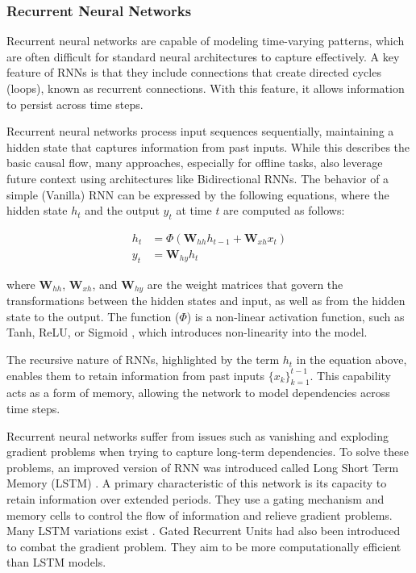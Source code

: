 \subsubsection*{Recurrent Neural Networks}
Recurrent neural networks \cite{giles1994dynamic} are capable of modeling time-varying patterns, which are often difficult for standard neural architectures to capture effectively. A key feature of RNNs is that they include connections that create directed cycles (loops), known as recurrent connections. With this feature, it allows information to persist across time steps.

Recurrent neural networks process input sequences sequentially, maintaining a hidden state that captures information from past inputs. While this describes the basic causal flow, many approaches, especially for offline tasks, also leverage future context using architectures like Bidirectional RNNs. The behavior of a simple (Vanilla) RNN can be expressed by the following equations, where the hidden state $h_t$ and the output $y_t$ at time $t$ are computed as follows:

\begin{align}
h_t &= \Phi(\mathbf{W}_{hh}h_{t-1} + \mathbf{W}_{xh}x_t) \label{eq:rnn_hidden_state} \\
y_t &= \mathbf{W}_{hy}h_t \label{eq:rnn_output}
\end{align}

where $\mathbf{W}_{hh}$, $\mathbf{W}_{xh}$, and $\mathbf{W}_{hy}$ are the weight matrices that govern the transformations between the hidden states and input, as well as from the hidden state to the output. The function ($\Phi$) is a non-linear activation function, such as Tanh, ReLU, or Sigmoid \cite{Goodfellow-et-al-2016}, which introduces non-linearity into the model.

The recursive nature of RNNs, highlighted by the term $h_t$ in the equation above, enables them to retain information from past inputs $\{x_k\}_{k=1}^{t-1}$. This capability acts as a form of memory, allowing the network to model dependencies across time steps.
\newline

Recurrent neural networks suffer from issues such as vanishing and exploding gradient problems when trying to capture long-term dependencies. To solve these problems, an improved version of RNN was introduced called Long Short Term Memory (LSTM) \cite{hochreiter1997long}. A primary characteristic of this network is its capacity to retain information over extended periods. They use a gating mechanism and memory cells to control the flow of information and relieve gradient problems. Many LSTM variations exist \cite{sak2014long}. Gated Recurrent Units \cite{chung2014empiricalevaluationgatedrecurrent} had also been introduced to combat the gradient problem. They aim to be more computationally efficient than LSTM models. \newline


